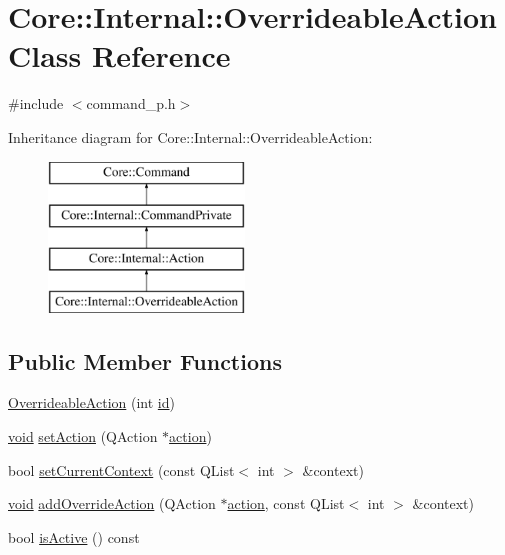 \hypertarget{class_core_1_1_internal_1_1_overrideable_action}{\section{\-Core\-:\-:\-Internal\-:\-:\-Overrideable\-Action \-Class \-Reference}
\label{class_core_1_1_internal_1_1_overrideable_action}
}


{\ttfamily \#include $<$command\-\_\-p.\-h$>$}

\-Inheritance diagram for \-Core\-:\-:\-Internal\-:\-:\-Overrideable\-Action\-:\begin{figure}[H]
\begin{center}
\leavevmode
\includegraphics[height=4.000000cm]{class_core_1_1_internal_1_1_overrideable_action}
\end{center}
\end{figure}
\subsection*{\-Public \-Member \-Functions}
\begin{DoxyCompactItemize}
\item 
\hyperlink{group___core_plugin_ga6f14414c6a5bec07b396e4563d738efb}{\-Overrideable\-Action} (int \hyperlink{group___core_plugin_gac039f1f888e5c7bd1a5d46458aeb1610}{id})
\item 
\hyperlink{group___u_a_v_objects_plugin_ga444cf2ff3f0ecbe028adce838d373f5c}{void} \hyperlink{group___core_plugin_ga243ee26e1559a0d60e0901f31b240d84}{set\-Action} (\-Q\-Action $\ast$\hyperlink{group___core_plugin_gaad3b2792dc4533f93c529fe55dcc26e8}{action})
\item 
bool \hyperlink{group___core_plugin_gab0f7a22e946de82d6a21ccc4dcd4c57e}{set\-Current\-Context} (const \-Q\-List$<$ int $>$ \&context)
\item 
\hyperlink{group___u_a_v_objects_plugin_ga444cf2ff3f0ecbe028adce838d373f5c}{void} \hyperlink{group___core_plugin_ga8b41e27764024e075b44525fee184192}{add\-Override\-Action} (\-Q\-Action $\ast$\hyperlink{group___core_plugin_gaad3b2792dc4533f93c529fe55dcc26e8}{action}, const \-Q\-List$<$ int $>$ \&context)
\item 
bool \hyperlink{group___core_plugin_gabfac13c8e9d1bb23e86a8f9d11c140e8}{is\-Active} () const 
\end{DoxyCompactItemize}


